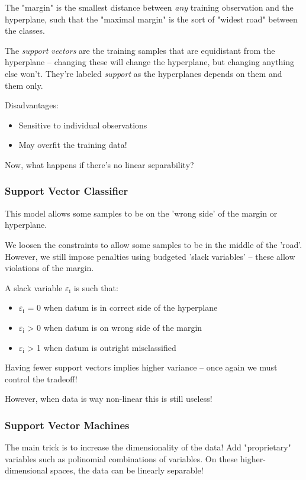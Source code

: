 \documentclass[11pt]{article}
\begin{document}
\begin{itemize}
The "margin" is the smallest distance between \emph{any} training observation and the hyperplane, such that the "maximal margin" is the sort of "widest road" between the classes.

The \emph{support vectors} are the training samples that are equidistant from the hyperplane -- changing these will change the hyperplane, but changing anything else won't. They're labeled \emph{support} as the hyperplanes depends on them and them only.

Disadvantages:
\begin{itemize}
\item Sensitive to individual observations
\item May overfit the training data!
\end{itemize}

Now, what happens if there's no linear separability?

\subsubsection*{Support Vector Classifier}
\label{sec-4-2-2}
This model allows some samples to be on the 'wrong side' of the margin or hyperplane. 

We loosen the constraints to allow some samples to be in the middle of the 'road'. However, we still impose penalties using budgeted 'slack variables' -- these allow violations of the margin. 

A slack variable $\varepsilon$$_{\text{i}}$ is such that:
\begin{itemize}
\item $\varepsilon$$_{\text{i}}$ = 0 when datum is in correct side of the hyperplane
\item $\varepsilon$$_{\text{i}}$ > 0 when datum is on wrong side of the margin
\item $\varepsilon$$_{\text{i}}$ > 1 when datum is outright misclassified
\end{itemize}

Having fewer support vectors implies higher variance -- once again we must control the tradeoff!

However, when data is way non-linear this is still useless!

\subsubsection*{Support Vector Machines}
\label{sec-4-2-3}
The main trick is to increase the dimensionality of the data! Add "proprietary" variables such as polinomial combinations of variables. On these higher-dimensional spaces, the data can be linearly separable!


\end{itemize}
\end{document}

